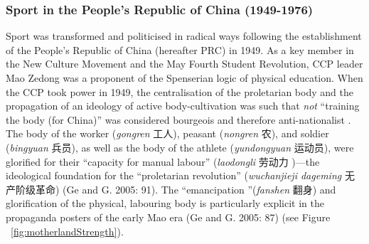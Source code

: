     \subsubsection{Sport in the People's Republic of China (1949-1976)}
    Sport was transformed and politicised in radical ways following the establishment of the People’s Republic of China (hereafter PRC) in 1949.  As a key member in the New Culture Movement and the May Fourth Student Revolution, CCP leader Mao Zedong was a proponent of the Spenserian logic of physical education.   When the CCP took power in 1949, the centralisation of the proletarian body and the propagation of an ideology of active body-cultivation was such that \textit{not} ``training the body (for China)'' was considered bourgeois and therefore anti-nationalist \citep[58]{Brownell1995}.  The body of the worker (\textit{gongren} 工人), peasant (\textit{nongren} 农), and soldier (\textit{bingyuan} 兵员), as well as the body of the athlete (\textit{yundongyuan} 运动员), were glorified for their ``capacity for manual labour'' (\textit{laodongli} 劳动力 )---the ideological foundation for the ``proletarian revolution'' (\textit{wuchanjieji dageming} 无产阶级革命) (Ge and G. 2005: 91).  The ``emancipation ''(\textit{fanshen} 翻身) and glorification of the physical, labouring body is particularly explicit in the propaganda posters of the early Mao era (Ge and G. 2005: 87) (see Figure ~\ref{fig:motherlandStrength}).

